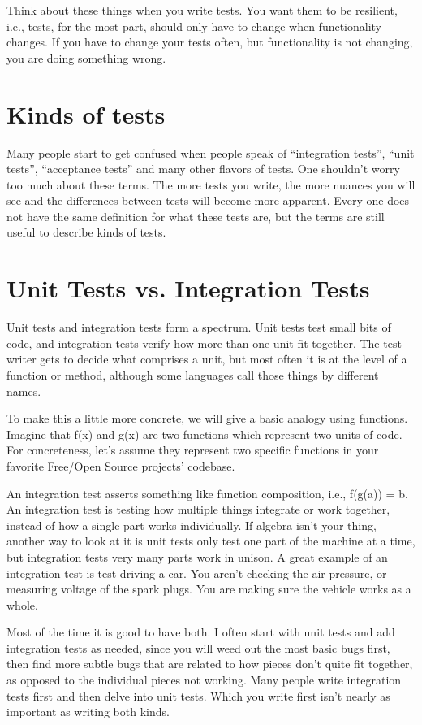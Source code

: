 Think about these things when you write tests. You want them to be resilient, i.e., tests, for the most part, should only have to change when functionality changes. If you have to change your tests often, but functionality is not changing, you are doing something wrong.

\section*{Kinds of tests}

Many people start to get confused when people speak of ``integration tests'', ``unit tests'', ``acceptance tests'' and many other flavors of tests. One shouldn't worry too much about these terms. The more tests you write, the more nuances you will see and the differences between tests will become more apparent. Every one does not have the same definition for what these tests are, but the terms are still useful to describe kinds of tests.

\section*{Unit Tests vs. Integration Tests}

Unit tests and integration tests form a spectrum. Unit tests test small bits of code, and integration tests verify how more than one unit fit together. The test writer gets to decide what comprises a unit, but most often it is at the level of a function or method, although some languages call those things by different names.

To make this a little more concrete, we will give a basic analogy using functions. Imagine that f(x) and g(x) are two functions which represent two units of code. For concreteness, let's assume they represent two specific functions in your favorite Free/Open Source projects' codebase.

An integration test asserts something like function composition, i.e., f(g(a)) = b. An integration test is testing how multiple things integrate or work together, instead of how a single part works individually. If algebra isn't your thing, another way to look at it is unit tests only test one part of the machine at a time, but integration tests very many parts work in unison. A great example of an integration test is test driving a car. You aren't checking the air pressure, or measuring voltage of the spark plugs. You are making sure the vehicle works as a whole.

Most of the time it is good to have both. I often start with unit tests and add integration tests as needed, since you will weed out the most basic bugs first, then find more subtle bugs that are related to how pieces don't quite fit together, as opposed to the individual pieces not working. Many people write integration tests first and then delve into unit tests. Which you write first isn't nearly as important as writing both kinds.
